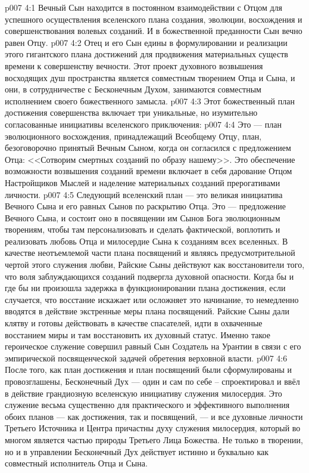 \vs p007 4:1 Вечный Сын находится в постоянном взаимодействии с Отцом для успешного осуществления  вселенского плана создания, эволюции, восхождения и совершенствования волевых созданий. И в божественной преданности Сын вечно равен Отцу.
\vs p007 4:2 Отец и его Сын едины в формулировании и реализации этого гигантского плана достижений для продвижения материальных существ времени к совершенству вечности. Этот проект духовного возвышения восходящих душ пространства является совместным творением Отца и Сына, и они, в сотрудничестве с Бесконечным Духом, занимаются совместным исполнением своего божественного замысла.
\vs p007 4:3 \pc Этот божественный план достижения совершенства включает три уникальные, но изумительно согласованные инициативы вселенского приключения:
\vs p007 4:4 \bibnobreakspace {} Это --- план эволюционного восхождения, принадлежащий Всеобщему Отцу, план, безоговорочно принятый Вечным Сыном, когда он согласился с предложением Отца: <<Сотворим смертных созданий по образу нашему>>. Это обеспечение возможности возвышения созданий времени включает в себя дарование Отцом Настройщиков Мыслей и наделение материальных созданий прерогативами личности.
\vs p007 4:5 \bibnobreakspace {} Следующий вселенский план --- это великая инициатива Вечного Сына и его равных Сынов по раскрытию Отца. Это --- предложение Вечного Сына, и состоит оно в посвящении им Сынов Бога эволюционным творениям, чтобы там персонализовать и сделать фактической, воплотить и реализовать любовь Отца и милосердие Сына к созданиям всех вселенных. В качестве неотъемлемой части плана посвящений и являясь предусмотрительной чертой этого служения любви, Райские Сыны действуют как восстановители того, что воля заблуждающихся созданий подвергла духовной опасности. Когда бы и где бы ни произошла задержка в функционировании плана достижения, если случается, что восстание искажает или осложняет это начинание, то немедленно вводятся в действие экстренные меры плана посвящений. Райские Сыны дали клятву и готовы действовать в качестве спасателей, идти в охваченные восстанием миры и там восстановить их духовный статус. Именно такое героическое служение совершил равный Сын Создатель на Урантии в связи с его эмпирической посвященческой задачей обретения верховной власти.
\vs p007 4:6 \bibnobreakspace {} После того, как план достижения и план посвящений были сформулированы и провозглашены, Бесконечный Дух --- один и сам по себе -- спроектировал и ввёл в действие грандиозную вселенскую инициативу служения милосердия. Это служение весьма существенно для практического и эффективного выполнения обоих планов --- как достижения, так и посвящений, --- и все духовные личности Третьего Источника и Центра причастны духу служения милосердия, который во многом является частью природы Третьего Лица Божества. Не только в творении, но и в управлении Бесконечный Дух действует истинно и буквально как совместный исполнитель Отца и Сына.

